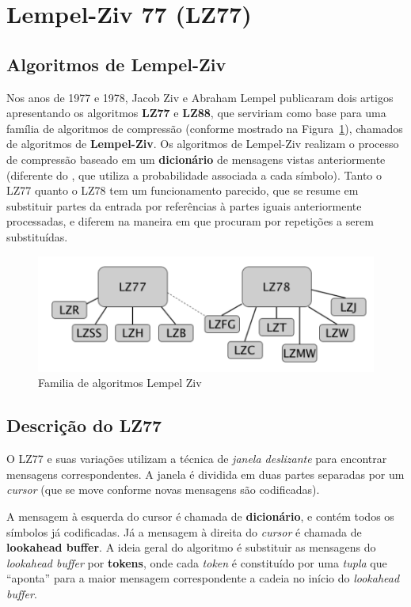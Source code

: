 \section{Lempel-Ziv 77 (LZ77)}

\subsection{Algoritmos de Lempel-Ziv}
Nos anos de 1977 e 1978, Jacob Ziv e Abraham Lempel publicaram dois artigos apresentando os algoritmos \textbf{LZ77} e \textbf{LZ88}, que serviriam como base para uma família de algoritmos de compressão (conforme mostrado na Figura~\ref{fig:lz77}), chamados de algoritmos de \textbf{Lempel-Ziv}.
Os algoritmos de Lempel-Ziv realizam o processo de compressão baseado em um \textbf{dicionário} de mensagens vistas anteriormente (diferente do , que utiliza a probabilidade associada a cada símbolo). 
Tanto o LZ77 quanto o LZ78 tem um funcionamento parecido, que se resume em substituir partes da entrada por referências à partes iguais anteriormente processadas, e diferem na maneira em que procuram por repetições a serem substituídas. 

\begin{figure}[h]
   \centering
   \includegraphics[scale=0.75]{figs/lz77fam.png}
    \caption{Familia de algoritmos Lempel Ziv}
    \label{fig:lz77}
 \end{figure}

\subsection{Descrição do LZ77}
O LZ77 e suas variações utilizam a técnica de \emph{janela deslizante} para encontrar mensagens correspondentes. 
A janela é dividida em duas partes separadas por um \emph{cursor} (que se move conforme novas mensagens são codificadas).

A mensagem à esquerda do cursor é chamada de \textbf{dicionário}, e contém todos os símbolos já codificadas. Já a mensagem à direita do \emph{cursor} é chamada de \textbf{lookahead buffer}.
A ideia geral do algoritmo é substituir as mensagens do \emph{lookahead buffer} por \textbf{tokens}, onde cada \emph{token} é constituído por uma \emph{tupla} que ``aponta''  para a maior mensagem correspondente a cadeia no início do \emph{lookahead buffer}.


